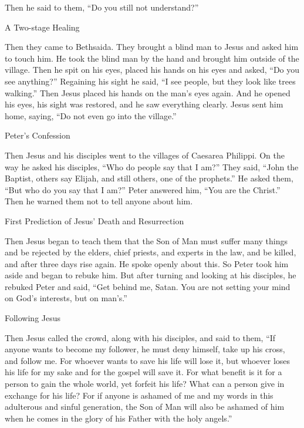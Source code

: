 {Then
he said
to them,
“Do you
still not
understand?”
\par }{\SH A Two-stage Healing
\par }{\PP {}Then
they came
to
Bethsaida.
They brought
a blind man
to Jesus
and
asked
him
to
touch
him.
He
took
the blind man
by the hand
and brought
him
outside
of
the village.
Then
he spit
on
his
eyes,
placed
his hands
on his
eyes and asked,
“Do you see
anything?”
Regaining
his sight
he said,
“I see
people,
but they look like
trees
walking.”
Then
Jesus placed
his hands
on
the man’s
eyes
again.
And
he opened
his eyes,
his sight was restored,
and
he saw
everything
clearly.
Jesus sent
him
home,
saying,
“Do
not even
go
into
the village.”
\par }{\SH Peter’s Confession
\par }{\PP {}Then
Jesus
and
his
disciples
went
to
the villages
of Caesarea
Philippi.
On
the way
he asked
his
disciples, “Who
do
people
say
that I am?”
They said, “John
the Baptist,
others
say
Elijah,
and still others,
one
of the prophets.”
He
asked
them,
“But
who
do you say
that I
am?” Peter
answered
him, “You
are
the Christ.”
Then
he warned
them
not
to tell
anyone
about
him.
\par }{\SH First Prediction of Jesus’ Death and Resurrection
\par }{\PP {}Then
Jesus began
to teach
them
that
the Son
of Man
must
suffer
many things
and
be rejected
by
the elders,
chief priests,
and
experts in the law,
and
be killed,
and
after
three
days
rise again.
He
spoke
openly
about this.
So
Peter
took
him
aside
and began
to rebuke
him.
But
after turning
and
looking at
his
disciples,
he rebuked
Peter
and
said,
“Get
behind
me,
Satan.
You are
not
setting
your mind on God’s interests,
but
on man’s.”
\par }{\SH Following Jesus
\par }{\PP {}Then
Jesus called
the crowd,
along with
his
disciples,
and said
to them,
“If
anyone
wants
to become
my
follower,
he must deny
himself,
take up
his
cross,
and
follow
me.
For
whoever
wants
to save
his
life
will lose
it,
but
whoever
loses
his
life
for
my
sake
and
for the gospel
will save
it.
For
what
benefit
is it for a person
to gain
the whole
world,
yet
forfeit
his
life?
What
can
a person
give
in exchange
for his
life?
For
if
anyone
is ashamed
of me
and
my
words
in
this
adulterous
and
sinful
generation,
the Son
of Man
will
also be ashamed
of him
when
he comes
in
the glory
of
his
Father
with
the holy
angels.”

}
